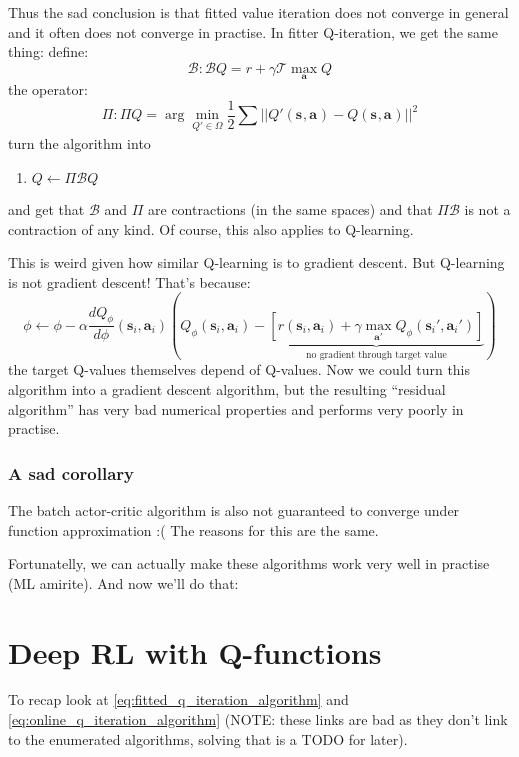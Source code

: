 \documentclass{report}
\newcommand{\argmin}{\arg\!\min}
\begin{document}
Thus the sad conclusion is that fitted value iteration does not converge in general
and it often does not converge in practise.
In fitter Q-iteration, we get the same thing:
define:
\begin{equation}
		\mathcal{B}: \mathcal{B} Q = r + \gamma \mathcal{T} \max_{\bm{a}} Q
\end{equation}
the operator:
\begin{equation}
		\Pi : \Pi Q = \argmin_{Q' \in \Omega} \frac{1}{2} \sum_{}^{} || Q'(\bm{s}_{}, \bm{a}_{}) - Q(\bm{s}_{}, \bm{a}_{})||^2
\end{equation}
turn the algorithm into
\begin{enumerate}
		\item $Q \leftarrow \Pi \mathcal{B} Q$
\end{enumerate}
and get that $\mathcal{B}$ and $\Pi$ are contractions (in the same spaces) and
that $\Pi\mathcal{B}$ is not a contraction of any kind.
Of course, this also applies to Q-learning.

This is weird given how similar Q-learning is to gradient descent.
But Q-learning is not gradient descent!
That's because:
\begin{equation}
	 \phi \leftarrow \phi - \alpha \frac{d Q_\phi}{d\phi} (\bm{s}_{i}, \bm{a}_{i}) \left( Q_\phi(\bm{s}_{i}, \bm{a}_{i}) - 
	 \underbrace{\left[ r(\bm{s}_{i}, \bm{a}_{i}) + \gamma \max_{\bm{a}'} Q_\phi (\bm{s}_{i}', \bm{a}_{i}') \right] }_{\text{no gradient through target value}}
\right)  	
\end{equation}
the target Q-values themselves depend of Q-values.
Now we could turn this algorithm into a gradient descent algorithm, but 
the resulting ``residual algorithm'' has very bad numerical properties and performs very poorly in practise.

\subsection{A sad corollary}
The batch actor-critic algorithm is also not guaranteed to converge under function approximation :(
\newline
The reasons for this are the same.

Fortunatelly, we can actually make these algorithms work very well in practise (ML amirite).
And now we'll do that:

\chapter{Deep RL with Q-functions}
To recap look at \ref{eq:fitted_q_iteration_algorithm} and \ref{eq:online_q_iteration_algorithm} (NOTE: these links are bad as they don't link to the 
enumerated algorithms, solving that is a TODO for later).
\end{document}
